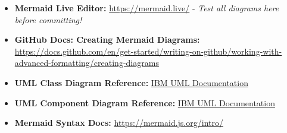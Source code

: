 \documentclass[a4paper,12pt]{article}
\begin{document}
\begin{itemize}
    \item \textbf{Mermaid Live Editor:} \href{https://mermaid.live/}{https://mermaid.live/} - \textit{Test all diagrams here before committing!}
    \item \textbf{GitHub Docs: Creating Mermaid Diagrams:} \href{https://docs.github.com/en/get-started/writing-on-github/working-with-advanced-formatting/creating-diagrams}{https://docs.github.com/en/get-started/writing-on-github/working-with-advanced-formatting/creating-diagrams}
    \item \textbf{UML Class Diagram Reference:} \href{https://www.ibm.com/docs/en/rational-soft-arch/9.7.0?topic=diagrams-class}{IBM UML Documentation}
    \item \textbf{UML Component Diagram Reference:} \href{https://www.ibm.com/docs/en/rational-soft-arch/9.7.0?topic=diagrams-component}{IBM UML Documentation}
    \item \textbf{Mermaid Syntax Docs:} \href{https://mermaid.js.org/intro/}{https://mermaid.js.org/intro/}
\end{itemize}
\end{document}
